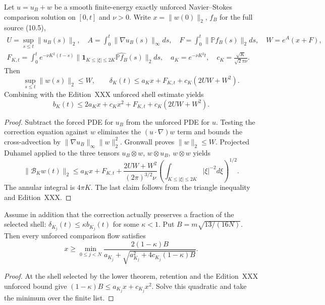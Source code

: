 \begin{theorem}
Let $u=u_B+w$ be a smooth finite-energy exactly unforced
Navier--Stokes comparison solution on $[0,t]$ and $\nu>0$.
Write $x=\|w(0)\|_2$, $f_B$ for the full source (10.5),
\[
\begin{gathered}
U=\sup_{s\le t}\|u_B(s)\|_2,\quad
A=\int_0^t\|\nabla u_B(s)\|_\infty ds,\quad
F=\int_0^t\|\mathbb P f_B(s)\|_2ds,\quad W=e^A(x+F),\\
F_{K,t}=\int_0^t e^{-\nu K^2(t-s)}
\|\mathbf1_{K\le|\xi|\le2K}\widehat{\mathbb P f_B}(s)\|_2ds,\quad
a_K=e^{-\nu K^2t},\quad c_K=\frac{\sqrt K}{\sqrt2\pi\nu}.
\end{gathered}
\]
Then
\begin{equation}\label{eq:xxxi-upper}
\boxed{\quad
\sup_{s\le t}\|w(s)\|_2\le W,\qquad
\delta_K(t)\le a_Kx+F_{K,t}+c_K(2UW+W^2).\quad}
\end{equation}
Combining with the Edition~XXX unforced shell estimate yields
\begin{equation}\label{eq:xxxi-tradeoff}
\boxed{\quad
b_K(t)\le2a_Kx+c_Kx^2+F_{K,t}+c_K(2UW+W^2).\quad}
\end{equation}
\end{theorem}
\begin{proof}
Subtract the forced PDE for $u_B$ from the unforced PDE for $u$.
Testing the correction equation against $w$ eliminates the
$(u\cdot\nabla)w$ term and bounds the cross-advection
by $\|\nabla u_B\|_\infty\|w\|_2^2$.
Gronwall proves $\|w\|_2\le W$.
Projected Duhamel applied to the three tensors
$u_B\otimes w$, $w\otimes u_B$, $w\otimes w$ yields
\[
\|\mathcal B_Kw(t)\|_2\le a_Kx+F_{K,t}
+\frac{2UW+W^2}{(2\pi)^{3/2}\nu}
\left(\int_{K\le|\xi|\le2K}|\xi|^{-2}d\xi\right)^{1/2}.
\]
The annular integral is $4\pi K$. The last claim follows
from the triangle inequality and Edition~XXX.
\end{proof}

\begin{corollary}
Assume in addition that the correction actually preserves a
fraction of the selected shell:
$\delta_{K_j}(t)\le\kappa b_{K_j}(t)$ for some $\kappa<1$.
Put $B=m\sqrt{13/(16N)}$. Then every unforced comparison flow
satisfies
\begin{equation}\label{eq:xxxi-retention}
\boxed{\quad x\ge\min_{0\le j<N}
\frac{2(1-\kappa)B}
{a_{K_j}+\sqrt{a_{K_j}^2+4c_{K_j}(1-\kappa)B}}.\quad}
\end{equation}
\end{corollary}
\begin{proof}
At the shell selected by the lower theorem, retention and the
Edition~XXX unforced bound give $(1-\kappa)B\le a_{K_j}x+c_{K_j}x^2$.
Solve this quadratic and take the minimum over the finite list.
\end{proof}

